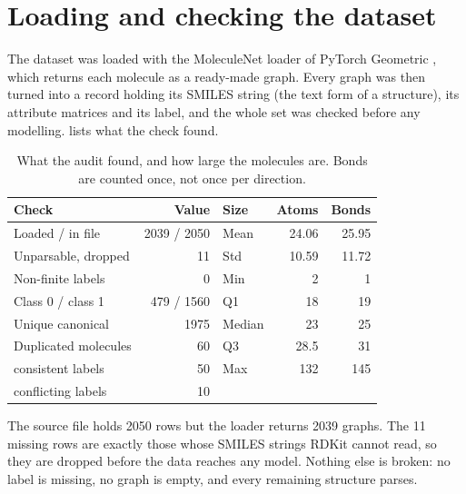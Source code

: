 \section{Loading and checking the dataset}
\label{part:data}

The dataset was loaded with the MoleculeNet loader of PyTorch Geometric \parencite{PyG}, which returns each molecule as a ready-made graph. Every graph was then turned into a record holding its SMILES string (the text form of a structure), its attribute matrices and its label, and the whole set was checked before any modelling.  lists what the check found.

\begin{table}[htb]
    \centering
    \caption{What the audit found, and how large the molecules are. Bonds are counted once, not once per direction.}
    \label{tab:audit}
    \footnotesize
    \setlength{\tabcolsep}{3pt}
    \begin{tabular}{@{}lr@{\hspace{0.5em}}lrr@{}}
        \toprule
        Check & Value & Size & Atoms & Bonds \\
        \midrule
        Loaded / in file      & 2039 / 2050 & Mean   & 24.06 & 25.95 \\
        Unparsable, dropped   & 11         & Std    & 10.59 & 11.72 \\
        Non-finite labels     & 0          & Min    & 2     & 1     \\
        Class 0 / class 1     & 479 / 1560 & Q1     & 18    & 19    \\
        Unique canonical      & 1975       & Median & 23    & 25    \\
        Duplicated molecules  & 60         & Q3     & 28.5  & 31    \\
        \quad consistent labels & 50       & Max    & 132   & 145   \\
        \quad conflicting labels & 10      &        &       &       \\
        \bottomrule
    \end{tabular}
\end{table}

The source file holds 2050 rows but the loader returns 2039 graphs. The 11 missing rows are exactly those whose SMILES strings RDKit \parencite{RDKit} cannot read, so they are dropped before the data reaches any model. Nothing else is broken: no label is missing, no graph is empty, and every remaining structure parses.

